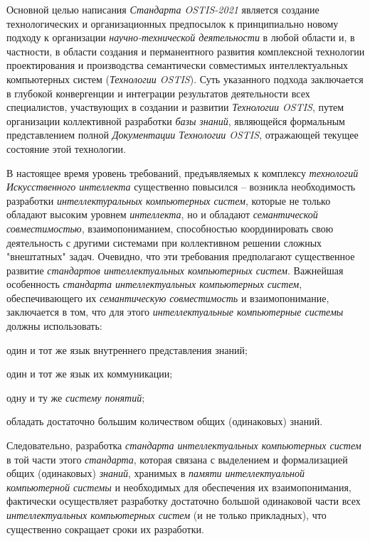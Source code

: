 \begin{SCn}
{\begin{scnitemize}
		Основной целью написания \textit{Стандарта OSTIS-2021} является создание технологических и организационных предпосылок к принципиально новому  подходу к организации \textit{научно-технической деятельности} в любой области и, в частности, в области создания и перманентного развития комплексной технологии проектирования и производства семантически совместимых интеллектуальных компьютерных систем (\textit{Технологии OSTIS}). Суть указанного подхода заключается  в глубокой конвергенции и интеграции результатов деятельности всех специалистов, участвующих в создании и развитии \textit{Технологии OSTIS}, путем организации коллективной разработки \textit{базы знаний}, являющейся формальным представлением полной \textit{Документации Технологии OSTIS}, отражающей текущее состояние этой технологии.
	\end{scnitemize}
В настоящее время уровень требований, предъявляемых к комплексу \textit{технологий Искусственного интеллекта} существенно повысился -- возникла необходимость разработки \textit{интеллектуральных компьютерных систем}, которые не только обладают высоким уровнем \textit{интеллекта}, но и обладают \textit{семантической совместимостью}, взаимопониманием, способностью координировать свою деятельность с другими системами при коллективном решении сложных "внештатных"{} задач. Очевидно, что эти требования предполагают существенное развитие  \textit{стандартов интеллектуальных компьютерных систем}. Важнейшая особенность \textit{стандарта интеллектуальных компьютерных систем}, обеспечивающего их \textit{семантическую совместимость} и взаимопонимание, заключается в том, что для этого \textit{интеллектуальные компьютерные системы} должны использовать:
\begin{scnitemize}
	\item   один и тот же язык внутреннего представления знаний;
	\item   один и тот же язык их коммуникации;
	\item   одну и ту же \textit{систему понятий};
	\item   обладать достаточно большим количеством  общих (одинаковых) знаний.
\end{scnitemize}

Следовательно, разработка \textit{стандарта интеллектуальных компьютерных систем} в той части этого \textit{стандарта}, которая связана с выделением и формализацией общих (одинаковых) \textit{знаний}, хранимых в \textit{памяти интеллектуальной компьютерной системы} и необходимых для обеспечения их взаимопонимания, фактически осуществляет разработку достаточно большой  одинаковой части всех \textit{интеллектуальных компьютерных систем} (и не только прикладных),  что существенно  сокращает сроки их разработки.

}
\end{SCn}
